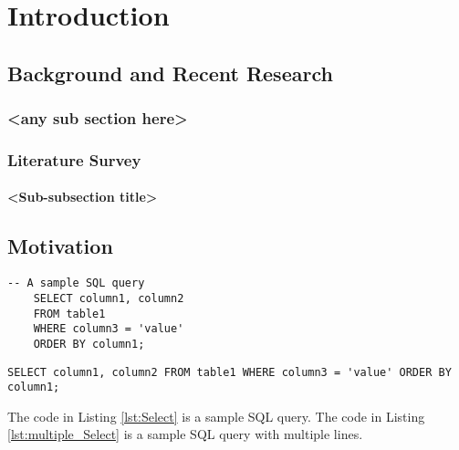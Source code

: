 \chapter{Introduction}
\hrulefill

\section{Background and Recent Research}
\subsection{<any sub section here>}

\subsection{Literature Survey}

\subsubsection{<Sub-subsection title>}


\section{Motivation}
\begin{lstlisting}[caption={Sample SQL code}, label={lst:Select}]
    -- A sample SQL query
    SELECT column1, column2
    FROM table1
    WHERE column3 = 'value'
    ORDER BY column1;
    \end{lstlisting}

\begin{lstlisting}[caption={Select query with multiple lines}, label={lst:multiple_Select}]
    SELECT column1, column2 FROM table1 WHERE column3 = 'value' ORDER BY column1;
    \end{lstlisting}

The code in Listing \ref{lst:Select} is a sample SQL query. The code in Listing \ref{lst:multiple_Select} is a sample SQL query with multiple lines.